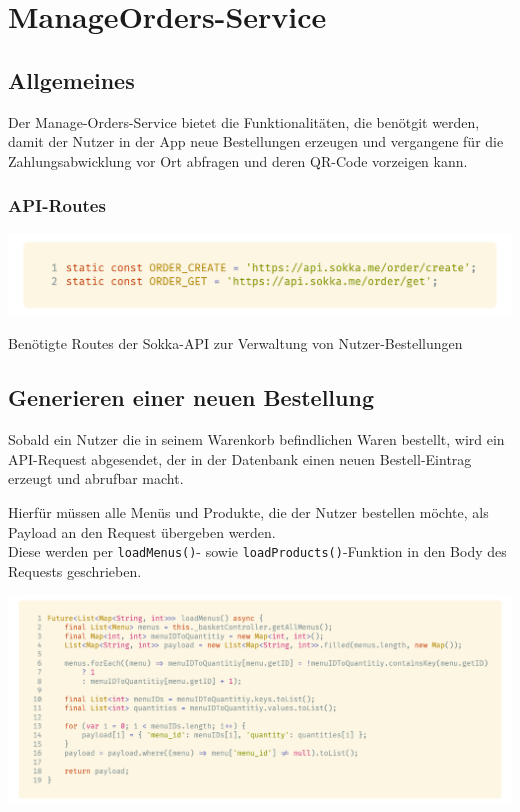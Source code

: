 \section{ManageOrders-Service}

\subsection{Allgemeines}

Der Manage-Orders-Service bietet die Funktionalitäten, die benötgit werden, damit der Nutzer in der
App neue Bestellungen erzeugen und vergangene für die Zahlungsabwicklung vor Ort abfragen und
deren QR-Code vorzeigen kann.

\subsubsection{API-Routes}

\begin{code}
    \centering
    \includegraphics[width=1\textwidth]{images/Client/services/manage-orders/orderRoutes.png}
    \caption{Benötigte Routes der Sokka-API zur Verwaltung von Nutzer-Bestellungen}
\end{code}

\subsection{Generieren einer neuen Bestellung}

Sobald ein Nutzer die in seinem Warenkorb befindlichen Waren bestellt, wird ein API-Request abgesendet,
der in der Datenbank einen neuen Bestell-Eintrag erzeugt und abrufbar macht.

Hierfür müssen alle Menüs und Produkte, die der Nutzer bestellen möchte, als Payload an den
Request übergeben werden.\\
Diese werden per \lstinline{loadMenus()}- sowie \lstinline{loadProducts()}-Funktion
in den Body des Requests geschrieben.

\begin{code}
    \centering
    \includegraphics[width=1\textwidth]{images/Client/services/manage-orders/createMenuPayload.png}
    \caption{\lstinline{loadMenus()}-Funktion zum Laden bestellter Menüs in den Request-Body}
\end{code}

